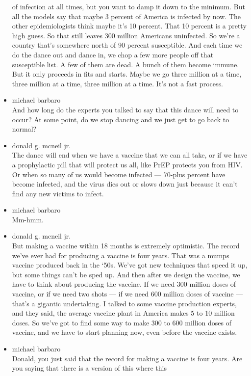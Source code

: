 \begin{itemize}
  of infection at all times, but you want to damp it down to the
  minimum. But all the models say that maybe 3 percent of America is
  infected by now. The other epidemiologists think maybe it's 10
  percent. That 10 percent is a pretty high guess. So that still leaves
  300 million Americans uninfected. So we're a country that's somewhere
  north of 90 percent susceptible. And each time we do the dance out and
  dance in, we chop a few more people off that susceptible list. A few
  of them are dead. A bunch of them become immune. But it only proceeds
  in fits and starts. Maybe we go three million at a time, three million
  at a time, three million at a time. It's not a fast process.
\item
  michael barbaro\\
  And how long do the experts you talked to say that this dance will
  need to occur? At some point, do we stop dancing and we just get to go
  back to normal?
\item
  donald g. mcneil jr.\\
  The dance will end when we have a vaccine that we can all take, or if
  we have a prophylactic pill that will protect us all, like PrEP
  protects you from HIV. Or when so many of us would become infected ---
  70-plus percent have become infected, and the virus dies out or slows
  down just because it can't find any new victims to infect.
\item
  michael barbaro\\
  Mm-hmm.
\item
  donald g. mcneil jr.\\
  But making a vaccine within 18 months is extremely optimistic. The
  record we've ever had for producing a vaccine is four years. That was
  a mumps vaccine produced back in the `50s. We've got new techniques
  that speed it up, but some things can't be sped up. And then after we
  design the vaccine, we have to think about producing the vaccine. If
  we need 300 million doses of vaccine, or if we need two shots --- if
  we need 600 million doses of vaccine --- that's a gigantic
  undertaking. I talked to some vaccine production experts, and they
  said, the average vaccine plant in America makes 5 to 10 million
  doses. So we've got to find some way to make 300 to 600 million doses
  of vaccine, and we have to start planning now, even before the vaccine
  exists.
\item
  michael barbaro\\
  Donald, you just said that the record for making a vaccine is four
  years. Are you saying that there is a version of this where this

\end{itemize}
